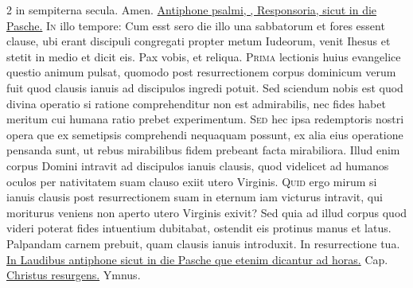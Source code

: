 \begin{multicols*}{2}
{in sempiterna secula. Amen.
}
\newline \ul{Antiphone psalmi, \Vbar , Responsoria, sicut in die Pasche.}
\lettrine[lines=2]{\zallmancaps \color{Red} I}{n} illo tempore: Cum esst sero die illo una sabbatorum et fores essent clause, ubi erant discipuli congregati propter metum Iudeorum, venit Ihesus et stetit in medio et dicit eis. Pax vobis, et reliqua.
\lettrine[lines=2]{\zallmancaps \color{Blue} P}{rima} lectionis huius evangelice questio animum pulsat, quomodo post resurrectionem corpus dominicum verum fuit quod clausis ianuis ad discipulos ingredi potuit. Sed sciendum nobis est quod divina operatio si ratione comprehenditur non est admirabilis, nec fides habet meritum cui humana ratio prebet experimentum.
\lettrine[lines=2]{\zallmancaps \color{Red} S}{ed} hec ipsa redemptoris nostri opera que ex semetipsis comprehendi nequaquam possunt, ex alia eius operatione pensanda sunt, ut rebus mirabilibus fidem prebeant facta mirabiliora. Illud enim corpus Domini intravit ad discipulos ianuis clausis, quod videlicet ad humanos oculos per nativitatem suam clauso exiit utero Virginis.
\lettrine[lines=2]{\zallmancaps \color{Blue} Q}{uid} ergo mirum si ianuis clausis post resurrectionem suam in eternum iam victurus intravit, qui moriturus veniens non aperto utero Virginis exivit? Sed quia ad illud corpus quod videri poterat fides intuentium dubitabat, ostendit eis protinus manus et latus. Palpandam carnem prebuit, quam clausis ianuis introduxit.
\newline \V In resurrectione tua. \ul{In Laudibus antiphone sicut in die Pasche que etenim dicantur ad horas.} {\color{Red} Cap.} \hyperlink{christus-resurgens-capitulum}{Christus resurgens.} {\color{Red} Ymnus.}
\end{multicols*}
